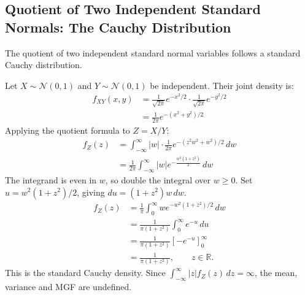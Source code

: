 \documentclass[12pt,a4paper]{article}
\begin{document}
\subsection{Quotient of Two Independent Standard Normals: The Cauchy Distribution}
The quotient of two independent standard normal variables follows a standard Cauchy distribution.
\begin{tcolorbox}[examplebox, title={\textbf{Classic Result: Ratio of Independent Standard Normals follows Cauchy}}]
Let $X \sim \mathcal{N}(0, 1)$ and $Y \sim \mathcal{N}(0, 1)$ be independent. Their joint density is:
\begin{equation}
  \begin{aligned}
    f_{XY}(x, y) &= \frac{1}{\sqrt{2\pi}} e^{-x^2/2} \cdot \frac{1}{\sqrt{2\pi}} e^{-y^2/2} \\[3pt]
    &= \frac{1}{2\pi} e^{-(x^2 + y^2)/2}
  \end{aligned}
\end{equation}
Applying the quotient formula to $Z = X/Y$:
\begin{equation}
  \begin{aligned}
    f_Z(z) &= \int_{-\infty}^\infty |w| \cdot \frac{1}{2\pi} e^{-(z^2 w^2 + w^2)/2} \, dw \\[3pt]
    &= \frac{1}{2\pi} \int_{-\infty}^\infty |w| e^{-\frac{w^2(1 + z^2)}{2}} \, dw
  \end{aligned}
\end{equation}
The integrand is even in $w$, so double the integral over $w\ge 0$. Set $u=w^2(1+z^2)/2$, giving $du=(1+z^2)w\,dw$.
\begin{equation}
  \begin{aligned}
    f_Z(z) &= \frac{1}{\pi}\int_0^\infty w e^{-w^2(1+z^2)/2}\,dw \\
           &= \frac{1}{\pi(1+z^2)}\int_0^\infty e^{-u}\,du \\
           &= \frac{1}{\pi(1+z^2)}\left[-e^{-u}\right]_0^\infty \\
           &= \frac{1}{\pi(1+z^2)},\qquad z\in\mathbb{R}.
  \end{aligned}
\end{equation}
This is the standard Cauchy density. Since $\int_{-\infty}^\infty |z|f_Z(z)\,dz=\infty$, the mean, variance and MGF are undefined.
\end{tcolorbox}
\end{document}
